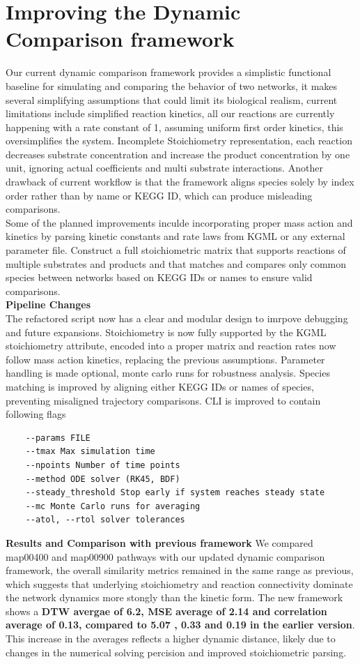 \documentclass[12pt,a4paper]{article}
\begin{document}
\section*{Improving the Dynamic Comparison framework}
Our current dynamic comparison framework provides a simplistic functional baseline for simulating and comparing the behavior of two networks, it makes several simplifying assumptions that could limit its biological realism, current limitations include simplified reaction kinetics, all our reactions are currently happening with a rate constant of 1, assuming uniform first order kinetics, this oversimplifies the system. Incomplete Stoichiometry representation, each reaction decreases substrate concentration and increase the product concentration by one unit, ignoring actual coefficients and multi substrate interactions. Another drawback of current workflow is that the framework aligns species solely by index order rather than by name or KEGG ID, which can produce misleading comparisons. \\
Some of the planned improvements inculde incorporating proper mass action and kinetics by parsing kinetic constants and rate laws from KGML or any external parameter file. Construct a full stoichiometric matrix that supports reactions of multiple substrates and products and that matches and compares only common species between networks based on KEGG IDs or names to ensure valid comparisons.\\
\textbf{Pipeline Changes} \\
The refactored script now has a clear and modular design to imrpove debugging and future expansions. Stoichiometry is now fully supported by the KGML stoichiometry attribute, encoded into a proper matrix and reaction rates now follow mass action kinetics, replacing the previous assumptions. Parameter handling is made optional, monte carlo runs for robustness analysis. Species matching is improved by aligning either KEGG IDs or names of species, preventing misaligned trajectory comparisons. CLI is improved to contain following flags \\
\begin{verbatim}
    --params FILE
    --tmax Max simulation time
    --npoints Number of time points
    --method ODE solver (RK45, BDF)
    --steady_threshold Stop early if system reaches steady state
    --mc Monte Carlo runs for averaging
    --atol, --rtol solver tolerances
\end{verbatim}
\textbf{Results and Comparison with previous framework}
We compared map00400 and map00900 pathways with our updated dynamic comparison framework, the overall similarity metrics remained in the same range as previous, which suggests that underlying stoichiometry and reaction connectivity dominate the network dynamics more stongly than the kinetic form. The new framework shows a \textbf{DTW avergae of 6.2, MSE average of 2.14 and correlation average of 0.13, compared to 5.07 , 0.33 and 0.19 in the earlier version}. This increase in the averages reflects a higher dynamic distance, likely due to changes in the numerical solving percision and improved stoichiometric parsing. \\
\end{document}
